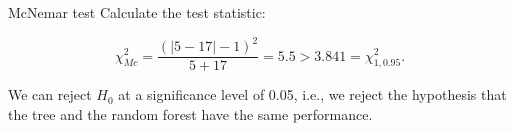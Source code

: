 \begin{vbframe}{McNemar test}
Calculate the test statistic:

$$\chi^2_{Mc} =  \frac{(|5-17| - 1)^2}{5 + 17} = 5.5 > 3.841 = \chi^2_{1,0.95}.$$

We can reject $H_0$ at a significance level of 0.05, i.e., we reject the hypothesis that the tree and the random forest have the same performance.

%
%

%
%
%
%
\end{vbframe}


